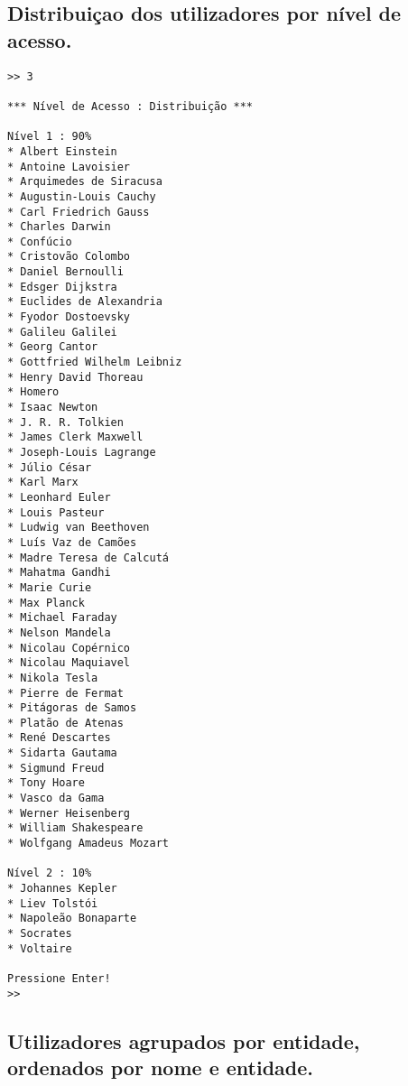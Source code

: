 \documentclass[11pt,a4paper]{report}%
\begin{document}
\subsection{Distribuiçao dos utilizadores por nível de acesso.}

\begin{verbatim}
>> 3

*** Nível de Acesso : Distribuição ***

Nível 1 : 90%
* Albert Einstein
* Antoine Lavoisier
* Arquimedes de Siracusa
* Augustin-Louis Cauchy
* Carl Friedrich Gauss
* Charles Darwin
* Confúcio
* Cristovão Colombo
* Daniel Bernoulli
* Edsger Dijkstra
* Euclides de Alexandria
* Fyodor Dostoevsky
* Galileu Galilei
* Georg Cantor
* Gottfried Wilhelm Leibniz
* Henry David Thoreau
* Homero
* Isaac Newton
* J. R. R. Tolkien
* James Clerk Maxwell
* Joseph-Louis Lagrange
* Júlio César
* Karl Marx
* Leonhard Euler
* Louis Pasteur
* Ludwig van Beethoven
* Luís Vaz de Camões
* Madre Teresa de Calcutá
* Mahatma Gandhi
* Marie Curie
* Max Planck
* Michael Faraday
* Nelson Mandela
* Nicolau Copérnico
* Nicolau Maquiavel
* Nikola Tesla
* Pierre de Fermat
* Pitágoras de Samos
* Platão de Atenas
* René Descartes
* Sidarta Gautama
* Sigmund Freud
* Tony Hoare
* Vasco da Gama
* Werner Heisenberg
* William Shakespeare
* Wolfgang Amadeus Mozart

Nível 2 : 10%
* Johannes Kepler
* Liev Tolstói
* Napoleão Bonaparte
* Socrates
* Voltaire

Pressione Enter!
>>  
\end{verbatim}


\subsection{Utilizadores agrupados por entidade, ordenados por nome e entidade.}
\end{document}
